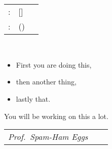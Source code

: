 \chapter*{\TransTask{}}

\makeatletter
\begin{tabular}{lp{0.7\linewidth}}
	\TransFor{}: & \textbf{\@author{}} [\@immnumber{}]\\
	\TransTopic{}: & \textbf{\@title} (\@thesis{})
\end{tabular}\\[\baselineskip]
\makeatother

\blindtext

\begin{itemize}
	\item First you are doing this,
	\item then another thing,
	\item lastly that.
\end{itemize}

You will be working on this a lot.

\vspace*{1.5cm}%
\begin{center}
	\begin{tabular}{M{12em}M{4em}M{12em}}
		{\textit{Prof.\ Spam-Ham Eggs}} & & \textit{\TransPlaceDate{}}\\
	\end{tabular}
\end{center}